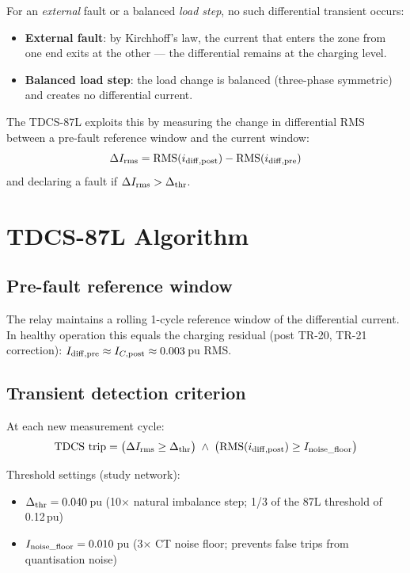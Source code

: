 \documentclass[11pt, a4paper]{article}
\begin{document}
For an \emph{external} fault or a balanced \emph{load step}, no such
differential transient occurs:
\begin{itemize}
  \item \textbf{External fault}: by Kirchhoff's law, the current that
        enters the zone from one end exits at the other — the differential
        remains at the charging level.
  \item \textbf{Balanced load step}: the load change is balanced
        (three-phase symmetric) and creates no differential current.
\end{itemize}

The TDCS-87L exploits this by measuring the change in differential RMS
between a pre-fault reference window and the current window:
\begin{equation}
  \Delta I_{\rm rms} = \text{RMS}(i_{\rm diff,post})
                     - \text{RMS}(i_{\rm diff,pre})
  \label{eq:delta_I}
\end{equation}
and declaring a fault if $\Delta I_{\rm rms} > \Delta_{\rm thr}$.


\section{TDCS-87L Algorithm}
\label{sec:algorithm}

\subsection{Pre-fault reference window}

The relay maintains a rolling 1-cycle reference window of the differential
current.  In healthy operation this equals the charging residual (post TR-20,
TR-21 correction): $I_{\rm diff,pre} \approx I_{C,\rm post} \approx 0.003$\,pu RMS.

\subsection{Transient detection criterion}

At each new measurement cycle:
\begin{equation}
  \text{TDCS trip} =
  \bigl(\Delta I_{\rm rms} \geq \Delta_{\rm thr}\bigr)
  \;\wedge\;
  \bigl(\text{RMS}(i_{\rm diff,post}) \geq I_{\rm noise\_floor}\bigr)
  \label{eq:tdcs_trip}
\end{equation}

Threshold settings (study network):
\begin{itemize}
  \item $\Delta_{\rm thr} = 0.040$\,pu (10$\times$ natural imbalance step;
        1/3 of the 87L threshold of 0.12\,pu)
  \item $I_{\rm noise\_floor} = 0.010$\,pu (3$\times$ CT noise floor;
        prevents false trips from quantisation noise)
\end{itemize}
\end{document}
